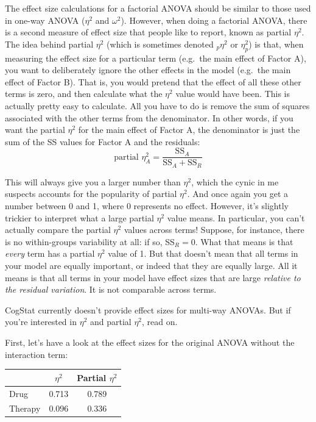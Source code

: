 \documentclass[
]{book}
\theoremstyle{definition}
\theoremstyle{definition}
\theoremstyle{definition}
\theoremstyle{definition}
\theoremstyle{remark}
\begin{document}
The effect size calculations for a factorial ANOVA should be similar to those used in one-way ANOVA (\(\eta^2\) and \(\omega^2\)). However, when doing a factorial ANOVA, there is a second measure of effect size that people like to report, known as partial \(\eta^2\). The idea behind partial \(\eta^2\) (which is sometimes denoted \(_p\eta^2\) or \(\eta^2_p\)) is that, when measuring the effect size for a particular term (e.g.~the main effect of Factor A), you want to deliberately ignore the other effects in the model (e.g.~the main effect of Factor B). That is, you would pretend that the effect of all these other terms is zero, and then calculate what the \(\eta^2\) value would have been. This is actually pretty easy to calculate. All you have to do is remove the sum of squares associated with the other terms from the denominator. In other words, if you want the partial \(\eta^2\) for the main effect of Factor A, the denominator is just the sum of the SS values for Factor A and the residuals:
\[
\mbox{partial } \eta^2_A = \frac{\mbox{SS}_{A}}{\mbox{SS}_{A} + \mbox{SS}_{R}}
\]

This will always give you a larger number than \(\eta^2\), which the cynic in me suspects accounts for the popularity of partial \(\eta^2\). And once again you get a number between 0 and 1, where 0 represents no effect. However, it's slightly trickier to interpret what a large partial \(\eta^2\) value means. In particular, you can't actually compare the partial \(\eta^2\) values across terms! Suppose, for instance, there is no within-groups variability at all: if so, SS\(_R = 0\). What that means is that \emph{every} term has a partial \(\eta^2\) value of 1. But that doesn't mean that all terms in your model are equally important, or indeed that they are equally large. All it means is that all terms in your model have effect sizes that are large \emph{relative to the residual variation}. It is not comparable across terms.

CogStat currently doesn't provide effect sizes for multi-way ANOVAs. But if you're interested in \(\eta^2\) and partial \(\eta^2\), read on.

First, let's have a look at the effect sizes for the original ANOVA without the interaction term:

\begin{longtable}[]{@{}lcc@{}}
\toprule()
& \(\eta^2\) & Partial \(\eta^2\) \\
\midrule()
\endhead
Drug & 0.713 & 0.789 \\
Therapy & 0.096 & 0.336 \\
\bottomrule()
\end{longtable}
\end{document}
